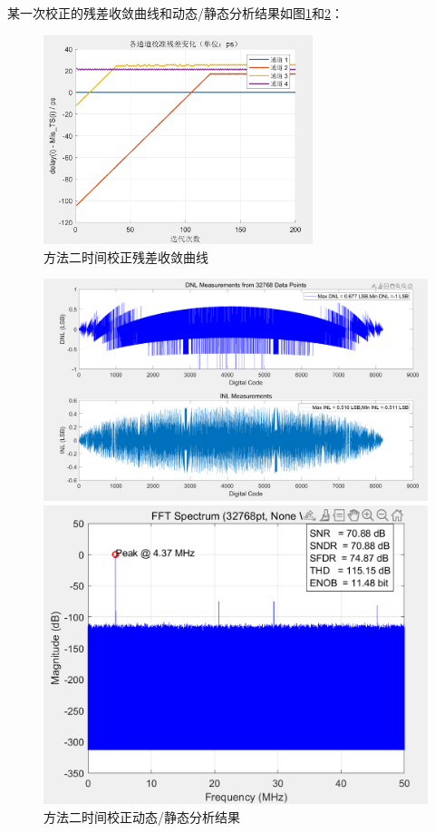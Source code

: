 \documentclass[cs4size,a4paper]{ctexart}
\numberwithin{equation}{section}
\numberwithin{table}{section}
\numberwithin{figure}{section}
\begin{document}
		
		
		
		
		某一次校正的残差收敛曲线和动态/静态分析结果如图\ref{fig:cor2}和\ref{fig:cor34}：
		\begin{figure}[H]
			\centering
			\includegraphics[width=0.7\textwidth]{figure/cor2.png}
			\caption{方法二时间校正残差收敛曲线} \label{fig:cor2}
		\end{figure}
		
		
		
			\begin{figure}[H]
				\centering
				\begin{minipage}{0.49\linewidth}
					\centering
					\includegraphics[width=0.9\linewidth]{figure/cor3.png}
				\end{minipage}
				\begin{minipage}{0.49\linewidth}
					\centering
					\includegraphics[width=0.9\linewidth]{figure/cor4.png}
				\end{minipage}
				\caption{方法二时间校正动态/静态分析结果} 
				\label{fig:cor34}
			\end{figure}
			
\end{document}
